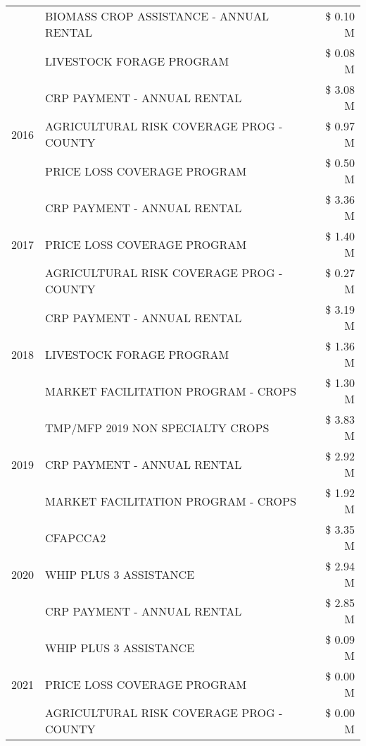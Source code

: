 \begin{tabular}{llr}
 & BIOMASS CROP ASSISTANCE - ANNUAL RENTAL & \$ 0.10 M \\
 & LIVESTOCK FORAGE PROGRAM & \$ 0.08 M \\
\cline{1-3}
\multirow[t]{3}{*}{2016} & CRP PAYMENT - ANNUAL RENTAL & \$ 3.08 M \\
 & AGRICULTURAL RISK COVERAGE PROG - COUNTY & \$ 0.97 M \\
 & PRICE LOSS COVERAGE PROGRAM & \$ 0.50 M \\
\cline{1-3}
\multirow[t]{3}{*}{2017} & CRP PAYMENT - ANNUAL RENTAL & \$ 3.36 M \\
 & PRICE LOSS COVERAGE PROGRAM & \$ 1.40 M \\
 & AGRICULTURAL RISK COVERAGE PROG - COUNTY & \$ 0.27 M \\
\cline{1-3}
\multirow[t]{3}{*}{2018} & CRP PAYMENT - ANNUAL RENTAL & \$ 3.19 M \\
 & LIVESTOCK FORAGE PROGRAM & \$ 1.36 M \\
 & MARKET FACILITATION PROGRAM - CROPS & \$ 1.30 M \\
\cline{1-3}
\multirow[t]{3}{*}{2019} & TMP/MFP 2019 NON SPECIALTY CROPS & \$ 3.83 M \\
 & CRP PAYMENT - ANNUAL RENTAL & \$ 2.92 M \\
 & MARKET FACILITATION PROGRAM - CROPS & \$ 1.92 M \\
\cline{1-3}
\multirow[t]{3}{*}{2020} & CFAPCCA2 & \$ 3.35 M \\
 & WHIP PLUS 3 ASSISTANCE & \$ 2.94 M \\
 & CRP PAYMENT - ANNUAL RENTAL & \$ 2.85 M \\
\cline{1-3}
\multirow[t]{3}{*}{2021} & WHIP PLUS 3 ASSISTANCE & \$ 0.09 M \\
 & PRICE LOSS COVERAGE PROGRAM & \$ 0.00 M \\
 & AGRICULTURAL RISK COVERAGE PROG - COUNTY & \$ 0.00 M \\
\cline{1-3}
\bottomrule
\end{tabular}
